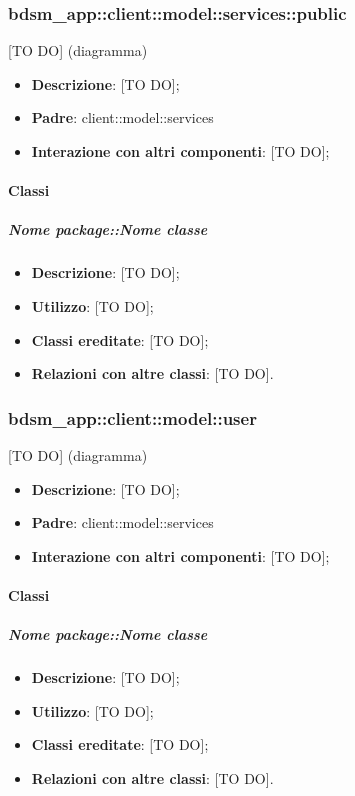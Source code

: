 \subsubsection{bdsm\_app::client::model::services::public} %
\label{ssub:bdsm_app_client_model_services_public}
[TO DO] (diagramma) \newline \newline

\begin{itemize}
	\item \textbf{Descrizione}: [TO DO];
	\item \textbf{Padre}: client::model::services
	\item \textbf{Interazione con altri componenti}: [TO DO];
\end{itemize}

	\paragraph{Classi} %
		\subparagraph{Nome package::Nome classe} %
		\label{subp:subparagraph_name}
			\begin{itemize}
				\item \textbf{Descrizione}: [TO DO];
				\item \textbf{Utilizzo}: [TO DO];
				\item \textbf{Classi ereditate}: [TO DO];
				\item \textbf{Relazioni con altre classi}: [TO DO].
			\end{itemize}	

\subsubsection{bdsm\_app::client::model::user} %
\label{ssub:bdsm_app_client_model_user}
[TO DO] (diagramma) \newline \newline

\begin{itemize}
	\item \textbf{Descrizione}: [TO DO];
	\item \textbf{Padre}: client::model::services
	\item \textbf{Interazione con altri componenti}: [TO DO];
\end{itemize}

	\paragraph{Classi} %
		\subparagraph{Nome package::Nome classe} %
		\label{subp:subparagraph_name}
			\begin{itemize}
				\item \textbf{Descrizione}: [TO DO];
				\item \textbf{Utilizzo}: [TO DO];
				\item \textbf{Classi ereditate}: [TO DO];
				\item \textbf{Relazioni con altre classi}: [TO DO].
			\end{itemize}	

